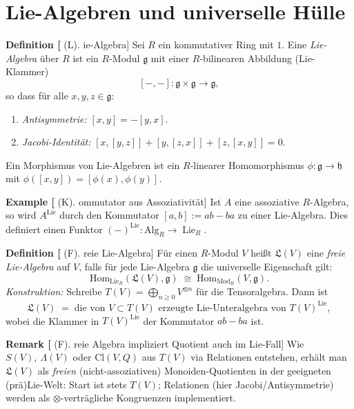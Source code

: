 \documentclass[10pt, letterpaper]{article}
\newcommand{\Mod}{\mathrm{Mod}}
\newcommand{\Alg}{\mathrm{Alg}}
\newcommand{\Hom}{\mathrm{Hom}}
\newcommand{\Cl}{\mathrm{Cl}}
\newcommand{\CustomHeading}[3]{%
  \par\medskip\noindent%
  \textbf{#1 #2} \textnormal{(#3)}.\enskip%
}
\newenvironment{DEF}[2]{\begin{unitbox}\CustomHeading{Definition}{#1}{#2}}{\end{unitbox}}
\newenvironment{REM}[2]{\begin{unitbox}\CustomHeading{Remark}{#1}{#2}}{\end{unitbox}}
\newenvironment{EXA}[2]{\begin{unitbox}\CustomHeading{Example}{#1}{#2}}{\end{unitbox}}
\begin{document}
\pagebreak

\section{Lie-Algebren und universelle Hülle}
\label{sec:lie-and-enveloping}

\begin{DEF}[Lie-Algebra]
Sei \(R\) ein kommutativer Ring mit \(1\). Eine \emph{Lie-Algebra} über \(R\) ist ein \(R\)-Modul \(\mathfrak{g}\) mit einer \(R\)-bilinearen Abbildung (Lie-Klammer)
\[
[-,-]:\mathfrak{g}\times\mathfrak{g}\to\mathfrak{g},
\]
so dass für alle \(x,y,z\in\mathfrak{g}\):
\begin{enumerate}[label=(\roman*), leftmargin=*]
\item \emph{Antisymmetrie:} \([x,y]= -[y,x]\).
\item \emph{Jacobi-Identität:} \([x,[y,z]]+[y,[z,x]]+[z,[x,y]]=0\).
\end{enumerate}
Ein Morphismus von Lie-Algebren ist ein \(R\)-linearer Homomorphismus \(\phi:\mathfrak{g}\to\mathfrak{h}\) mit \(\phi([x,y])=[\phi(x),\phi(y)]\).
\end{DEF}

\begin{EXA}[Kommutator aus Assoziativität]
Ist \(A\) eine assoziative \(R\)-Algebra, so wird \(A^{\operatorname{Lie}}\) durch den Kommutator
\([a,b]:=ab-ba\) zu einer Lie-Algebra. Dies definiert einen Funktor
\((-)^{\operatorname{Lie}}:\Alg_R\to\operatorname{Lie}_R\).
\end{EXA}

\begin{DEF}[Freie Lie-Algebra]
Für einen \(R\)-Modul \(V\) heißt \(\mathfrak{L}(V)\) eine \emph{freie Lie-Algebra} auf \(V\),
falls für jede Lie-Algebra \(\mathfrak{g}\) die universelle Eigenschaft gilt:
\[
\Hom_{\operatorname{Lie}_R}(\mathfrak{L}(V),\mathfrak{g}) \;\cong\; \Hom_{\Mod_R}(V,\mathfrak{g}).
\]
\emph{Konstruktion:} Schreibe \(T(V)=\bigoplus_{n\ge0}V^{\otimes n}\) für die Tensoralgebra. Dann ist
\[
\mathfrak{L}(V)\;=\; \text{die von }V\subset T(V)\text{ erzeugte Lie-Unteralgebra von }T(V)^{\operatorname{Lie}},
\]
wobei die Klammer in \(T(V)^{\operatorname{Lie}}\) der Kommutator \(ab-ba\) ist.
\end{DEF}

\begin{REM}[Freie Algebra impliziert Quotient auch im Lie-Fall]
Wie \(S(V),\ \Lambda(V)\) oder \(\Cl(V,Q)\) aus \(T(V)\) via Relationen entstehen, erhält man \(\mathfrak{L}(V)\) als \emph{freien} (nicht-assoziativen) Monoiden-Quotienten in der geeigneten (prä)Lie-Welt: Start ist stets \(T(V)\); Relationen (hier Jacobi/Antisymmetrie) werden als \(\otimes\)-verträgliche Kongruenzen implementiert.
\end{REM}
\end{document}
